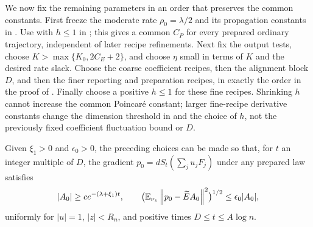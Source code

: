 We now fix the remaining parameters in an order that preserves the
common constants.  First freeze the
moderate rate $\rho_0=\lambda/2$ and its propagation constants in
.  Use
 with $h\le1$ in
; this gives a common $C_P$
for every prepared ordinary trajectory, independent of later recipe
refinements.  Next fix the output tests, choose
$K>\max\{K_0,2C_E+2\}$, and choose $\eta$ small in terms of $K$
and the desired rate slack.  Choose the coarse coefficient recipes,
then the alignment block $D$, and then the finer reporting and
preparation recipes, in exactly the order in the proof of
.  Finally choose a positive $h\le1$
for these fine recipes.  Shrinking $h$ cannot increase the common
Poincar\'e constant; larger fine-recipe derivative constants change
the dimension threshold in  and the
choice of $h$, not the previously fixed coefficient fluctuation
bound or $D$.

\begin{lemma}
\label{lem:cutoff-cone}
Given $\xi_1>0$ and $\epsilon_0>0$, the preceding choices can be
made so that, for $t$ an integer multiple of $D$, the gradient
$p_0=dS_t(\sum_j u_jF_j)$ under any prepared law satisfies
\begin{equation}
 |A_0|\ge c e^{-(\lambda+\xi_1)t},\qquad
 \bigl(\mathbb E_{\nu_z}\left\lVert p_0-\widetilde E A_0\right\rVert^2\bigr)^{1/2}
       \le\epsilon_0|A_0|,
 \label{eq:cutoff-cone-output}
\end{equation}
uniformly for $|u|=1$, $|z|<R_n$, and positive times
$D\le t\le A\log n$.
\end{lemma}


